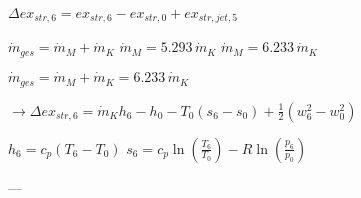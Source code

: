 \( \Delta ex_{str,6} = ex_{str,6} - ex_{str,0} + ex_{str,jet,5} \)  

\( \dot{m}_{ges} = \dot{m}_M + \dot{m}_K \)  
\( \dot{m}_M = 5.293 \, \dot{m}_K \)  
\( \dot{m}_M = 6.233 \, \dot{m}_K \)  

\( \dot{m}_{ges} = \dot{m}_M + \dot{m}_K = 6.233 \, \dot{m}_K \)  

\( \rightarrow \Delta ex_{str,6} = \dot{m}_K h_6 - h_0 - T_0 (s_6 - s_0) + \frac{1}{2} (w_6^2 - w_0^2) \)  

\( h_6 = c_p (T_6 - T_0) \)  
\( s_6 = c_p \ln \left(\frac{T_6}{T_0}\right) - R \ln \left(\frac{p_6}{p_0}\right) \)  

---